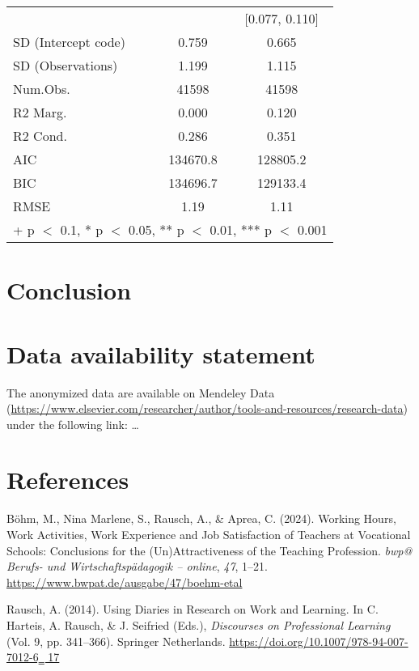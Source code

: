 \documentclass[
]{article}
\newlength{\cslhangindent}
\newenvironment{CSLReferences}[2] %
 {\begin{list}{}{%
  \setlength{\itemindent}{0pt}
  \setlength{\leftmargin}{0pt}
  \setlength{\parsep}{0pt}
  \ifodd #1
   \setlength{\leftmargin}{\cslhangindent}
   \setlength{\itemindent}{-1\cslhangindent}
  \fi
  \setlength{\itemsep}{#2\baselineskip}}}
 {\end{list}}
\begin{document}
\begin{table}[H]
\begin{tabular}[t]{lcc}
 &  & {}[\num{0.077}, \num{0.110}]\\
SD (Intercept code) & \num{0.759} & \num{0.665}\\
SD (Observations) & \num{1.199} & \num{1.115}\\
\midrule
Num.Obs. & \num{41598} & \num{41598}\\
R2 Marg. & \num{0.000} & \num{0.120}\\
R2 Cond. & \num{0.286} & \num{0.351}\\
AIC & \num{134670.8} & \num{128805.2}\\
BIC & \num{134696.7} & \num{129133.4}\\
RMSE & \num{1.19} & \num{1.11}\\
\bottomrule
\multicolumn{3}{l}{\rule{0pt}{1em}+ p $<$ 0.1, * p $<$ 0.05, ** p $<$ 0.01, *** p $<$ 0.001}\\
\end{tabular}
\end{table}

\section{Conclusion}\label{conclusion}

\newpage

\section{Data availability statement}\label{data-availability-statement}

The anonymized data are available on Mendeley Data
(\url{https://www.elsevier.com/researcher/author/tools-and-resources/research-data})
under the following link: \ldots{}\\

\section{References}\label{references}

\label{refs}
\begin{CSLReferences}{1}{0}
Böhm, M., Nina Marlene, S., Rausch, A., \& Aprea, C. (2024). Working
Hours, Work Activities, Work Experience and Job Satisfaction of Teachers
at Vocational Schools: Conclusions for the (Un)Attractiveness of the
Teaching Profession. \emph{bwp@ Berufs- und Wirtschaftspädagogik --
online}, \emph{47}, 1--21.
\url{https://www.bwpat.de/ausgabe/47/boehm-etal}

Rausch, A. (2014). Using {Diaries} in {Research} on {Work} and
{Learning}. In C. Harteis, A. Rausch, \& J. Seifried (Eds.),
\emph{Discourses on {Professional Learning}} (Vol. 9, pp. 341--366).
Springer Netherlands.
\href{https://doi.org/10.1007/978-94-007-7012-6‗\%2017}{https://doi.org/10.1007/978-94-007-7012-6‗
17}

\end{CSLReferences}
\end{document}
